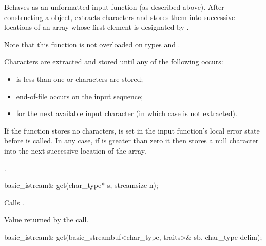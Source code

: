 \begin{itemdescr}
\pnum
\effects
Behaves as an unformatted input function
(as described above).
After constructing a  object, extracts
characters and stores them
into successive locations of an array whose first element is designated by
.
\begin{footnote}
Note that this function is not overloaded on types
and
.
\end{footnote}
Characters are extracted and stored until any of the following occurs:
\begin{itemize}
\item
{} is less than one or 
characters are stored;
\item
end-of-file occurs on the input sequence;
\item
{}
for the next available input
character 
(in which case  is not extracted).
\end{itemize}

\pnum
If the function stores no characters,
 is set in the input function's local error state
before  is called.
In any case, if  is greater than zero it then stores a null character
into the next successive location of the array.

\pnum
\returns
{}.
\end{itemdescr}

%
\begin{itemdecl}
basic_istream& get(char_type* s, streamsize n);
\end{itemdecl}

\begin{itemdescr}
\pnum
\effects
Calls
.

\pnum
\returns
Value returned by the call.
\end{itemdescr}

%
\begin{itemdecl}
basic_istream& get(basic_streambuf<char_type, traits>& sb, char_type delim);
\end{itemdecl}

